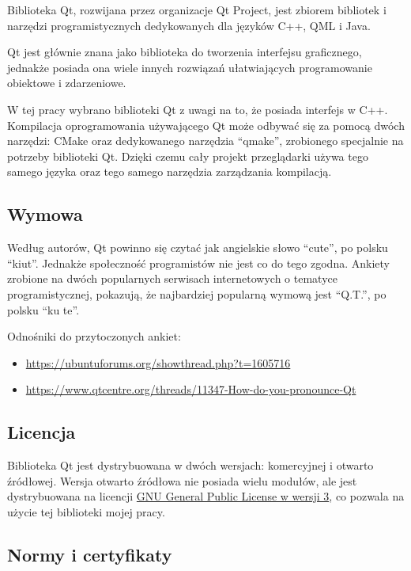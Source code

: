 \par
Biblioteka Qt, rozwijana przez organizacje Qt Project, jest zbiorem bibliotek i narzędzi programistycznych dedykowanych dla języków C++, QML i Java.
\par
Qt jest głównie znana jako biblioteka do tworzenia interfejsu graficznego, jednakże posiada ona wiele innych rozwiązań ułatwiających programowanie obiektowe i zdarzeniowe.
\par
W tej pracy wybrano biblioteki Qt z uwagi na to, że posiada interfejs w C++.
Kompilacja oprogramowania używającego Qt może odbywać się za pomocą dwóch narzędzi: CMake oraz dedykowanego narzędzia \enquote{qmake}, zrobionego specjalnie na potrzeby biblioteki Qt.
Dzięki czemu cały projekt przeglądarki używa tego samego języka oraz tego samego narzędzia zarządzania kompilacją.

\subsection{Wymowa}

\par
Według autorów, Qt powinno się czytać jak angielskie słowo \enquote{cute}, po polsku \enquote{kiut}.
Jednakże społeczność programistów nie jest co do tego zgodna.
Ankiety zrobione na dwóch popularnych serwisach internetowych o tematyce programistycznej, pokazują, że najbardziej popularną wymową jest \enquote{Q.T.}, po polsku \enquote{ku te}.
\par
Odnośniki do przytoczonych ankiet:
\begin{itemize}
    \item \url{https://ubuntuforums.org/showthread.php?t=1605716}
    \item \url{https://www.qtcentre.org/threads/11347-How-do-you-pronounce-Qt}
\end{itemize}

\subsection{Licencja}

\par
Biblioteka Qt jest dystrybuowana w dwóch wersjach: komercyjnej i otwarto źródłowej.
Wersja otwarto źródłowa nie posiada wielu modułów, ale jest dystrybuowana na licencji \href{https://www.gnu.org/licenses/gpl.html}{GNU General Public License w wersji 3}, co pozwala na użycie tej biblioteki mojej pracy.

\subsection{Normy i certyfikaty}

